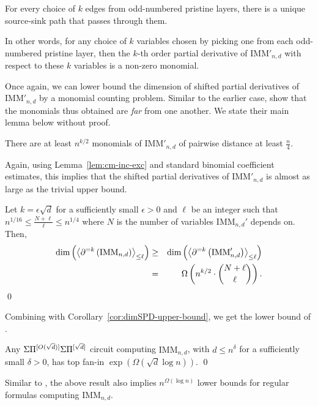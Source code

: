 \begin{observation}
For every choice of $k$ edges from odd-numbered pristine layers, there is a unique source-sink path that passes through them. 

In other words, for any choice of $k$ variables chosen by picking one from each odd-numbered pristine layer, then the $k$-th order partial derivative of $\mathrm{IMM}'_{n,d}$ with respect to these $k$ variables is a non-zero monomial. 
\end{observation}

Once again, we can lower bound the dimension of shifted partial derivatives of $\mathrm{IMM}'_{n,d}$ by a monomial counting problem. Similar to the earlier case, \cite{FLMS13} show that the monomials thus obtained are \emph{far} from one another. We state their main lemma below without proof. 

\begin{lemma}
There are at least $n^{k/2}$ monomials of $\mathrm{IMM}'_{n,d}$ of pairwise distance at least $\frac{n}{4}$. 
\end{lemma}

Again, using Lemma~\ref{lem:cm-inc-exc} and standard binomial coefficient estimates, this implies that the shifted partial derivatives of $\mathrm{IMM}'_{n,d}$ is almost as large as the trivial upper bound. 

\begin{theorem}Let $k = \epsilon\sqrt{d}$ for a sufficiently small $\epsilon > 0$ and $\ell$ be an integer such that $n^{1/16} \leq \frac{N + \ell}{\ell} \leq n^{1/4}$ where $N$ is the number of variables $\mathrm{IMM}_{n,d}'$ depends on. Then, 
\begin{eqnarray*}
\dim\left(\left\langle\partial^{=k}\left(\mathrm{IMM}_{n,d}\right)\right\rangle_{\leq \ell}\right) &\geq& \dim\left(\left\langle\partial^{=k}\left(\mathrm{IMM}'_{n,d}\right)\right\rangle_{\leq \ell}\right) \\
& =& \Omega\left(n^{k/2} \cdot \binom{N + \ell}{\ell}\right).
\end{eqnarray*}
\qed
\end{theorem}

Combining with Corollary~\ref{cor:dimSPD-upper-bound}, we get the lower bound of \cite{FLMS13}. 

\begin{theorem}
Any $\Sigma\Pi^{[O(\sqrt{d})]}\Sigma\Pi^{[\sqrt{d}]}$ circuit computing $\mathrm{IMM}_{n,d}$, with $d \leq n^{\delta}$ for a sufficiently small $\delta > 0$, has top fan-in $\exp(\Omega(\sqrt{d}\log n))$. \qed
\end{theorem}

Similar to \cite{KSS13}, the above result also implies $n^{\Omega(\log n)}$ lower bounds for regular formulas computing $\mathrm{IMM}_{n,d}$. 








